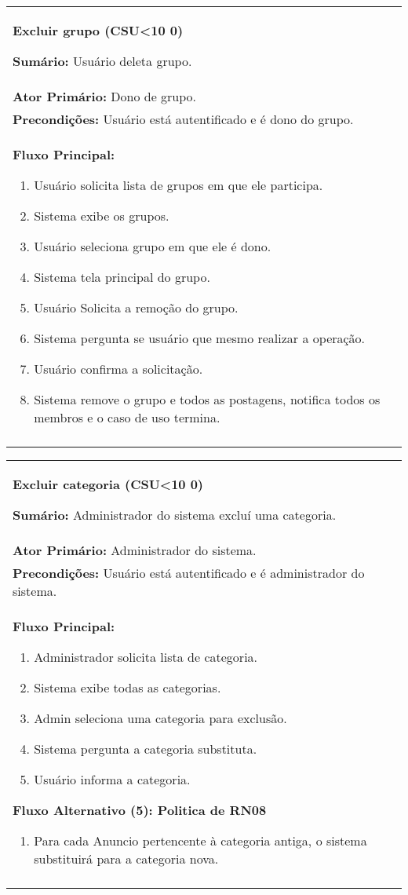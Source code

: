 \documentclass{article}
\newcounter{cscounter}
\newcommand{\sumario}[1] {\textbf{Sumário:} #1\\ }
\newcommand{\ator}[1] {\textbf{Ator Primário:} #1\\}
\newcommand{\precond}[1] {\textbf{Precondições:} #1\\}
\newcommand{\fluxo}{\textbf{Fluxo Principal:}}
\newenvironment{fluxoa}[2]
	{
		\textbf{Fluxo Alternativo (#1): #2}
		\begin{enumerate}[itemsep=0mm, label=(\alph*)]			
	}
	{
		\end{enumerate}			
	}
\newenvironment{casosdeuso}[1]
{
 \stepcounter{cscounter}
 \begin{center}
 \begin{tabular}{|p{\textwidth}|}
 \hline
 \begin{center}
 \large \textbf{#1 (CSU\ifnum\value{cscounter}<10 0\fi\arabic{cscounter})}
 \end{center}
}
{ 
 \\\\\hline
 \end{tabular} 
 \end{center}
}
\begin{document}
\begin{casosdeuso}{Excluir grupo}
 \sumario{Usuário deleta grupo.}
 \ator{Dono de grupo.}
 \precond{Usuário está autentificado e é dono do grupo.}
\fluxo
\begin{enumerate}[itemsep=0mm]
 \item Usuário solicita lista de grupos em que ele participa.
 \item Sistema exibe os grupos.
 \item Usuário seleciona grupo em que ele é dono.
 \item Sistema tela principal do grupo.
 \item Usuário Solicita a remoção do grupo.
 \item Sistema pergunta se usuário que mesmo realizar a operação.
 \item Usuário confirma a solicitação.
 \item Sistema remove o grupo e todos as postagens, notifica todos os membros e o caso de uso termina.
\end{enumerate}
\end{casosdeuso}

 

\begin{casosdeuso}{Excluir categoria}
 \sumario{Administrador do sistema excluí uma categoria.}
 \ator{Administrador do sistema.}
 \precond{Usuário está autentificado e é administrador do sistema.}
\fluxo
\begin{enumerate}[itemsep=0mm]
 \item Administrador solicita lista de categoria.
 \item Sistema exibe todas as categorias.
 \item Admin seleciona uma categoria  para exclusão.
 \item Sistema pergunta a categoria substituta.
 \item Usuário informa a categoria.
 \end{enumerate}
 \begin{fluxoa}{5}{Politica de RN08}
  \item Para cada Anuncio pertencente à categoria antiga, o sistema substituirá para a categoria nova.
  \end{fluxoa}
\end{casosdeuso}
\end{document}
